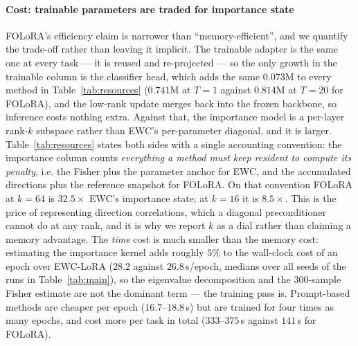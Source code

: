 \paragraph{Cost: trainable parameters are traded for importance state}
FOLoRA's efficiency claim is narrower than ``memory-efficient'', and we quantify the
trade-off rather than leaving it implicit. The trainable adapter is the same one at every
task --- it is reused and re-projected --- so the only growth in the trainable column is the
classifier head, which adds the same $0.073$M to every method in Table~\ref{tab:resources}
($0.741$M at $T{=}1$ against $0.814$M at $T{=}20$ for FOLoRA), and the low-rank update merges
back into the frozen backbone, so inference costs nothing extra. Against
that, the importance model is a per-layer rank-$k$ subspace rather than EWC's per-parameter
diagonal, and it is larger. Table~\ref{tab:resources} states both sides with a single
accounting convention: the importance column counts \emph{everything a method must keep
resident to compute its penalty}, i.e. the Fisher plus the parameter anchor for EWC, and
the accumulated directions plus the reference snapshot for FOLoRA. On that convention
FOLoRA at $k{=}64$ is $32.5\times$ EWC's importance state; at $k{=}16$ it is $8.5\times$.
This is the price of representing direction correlations, which a diagonal preconditioner
cannot do at any rank, and it is why we report $k$ as a dial rather than claiming a memory
advantage. The \emph{time} cost is much smaller than the memory cost: estimating the
importance kernel adds roughly $5\%$ to the wall-clock cost of an epoch over EWC-LoRA
($28.2$ against $26.8$\,s/epoch, medians over all seeds of the runs in
Table~\ref{tab:main}), so the eigenvalue decomposition and the $300$-sample Fisher estimate
are not the dominant term --- the training pass is. Prompt-based methods are cheaper per
epoch ($16.7$--$18.8$\,s) but are trained for four times as many epochs, and cost more per
task in total ($333$--$375$\,s against $141$\,s for FOLoRA).

